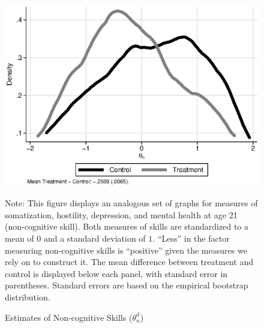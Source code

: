 \documentclass[static]{JJH-Beamer}
\begin{document}
\begin{frame}

\begin{figure}[H]
\caption{Estimates of Non-cognitive Skills ($\theta_{n}^d$)}\label{fig:c}
\begin{center}
\includegraphics[width=.65\textwidth]{output/abccare_nfactor.eps}
\end{center}
\tiny \flushleft Note: This figure displays an analogous set of graphs for measures of somatization, hostility, depression, and mental health at age 21 (non-cognitive skill). Both measures of skills are standardized to a mean of $0$ and a standard deviation of $1$. ``Less'' in the factor measuring non-cognitive skills is ``positive'' given the measures we rely on to construct it. The mean difference between treatment and control is displayed below each panel, with standard error in parentheses. Standard errors are based on the empirical bootstrap distribution.\\
\end{figure}

\end{frame}
\end{document}
